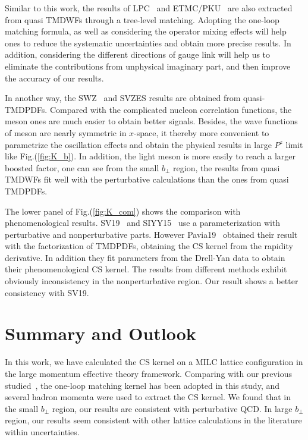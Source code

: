 \documentclass[prd,aps,twocolumn,preprintnumbers, showpacs, nofootinbib,superscriptaddress,notitlepage]{revtex4-1}
\begin{document}
Similar to this work, the results of LPC~\cite{LatticeParton:2020uhz} and ETMC/PKU~\cite{Li:2021wvl} are also extracted from quasi TMDWFs through a tree-level matching. Adopting the one-loop matching formula, as well as considering the operator mixing effects will help ones to reduce the systematic uncertainties and obtain more precise results. In addition, considering the different directions of gauge link will help us to eliminate the contributions from unphysical imaginary part, and then improve the accuracy of our results.

In another way, the SWZ~\cite{Shanahan:2021tst} and SVZES\cite{Schlemmer:2021aij} results are obtained from quasi-TMDPDFs. Compared with the complicated nucleon correlation functions, the meson ones are much easier to obtain better signals.  Besides, the wave functions of meson are nearly symmetric in $x$-space, it thereby more convenient to parametrize the oscillation effects and obtain the physical results in large $P^z$ limit like Fig.(\ref{fig:K_b}). In addition, the light meson is more easily to reach a larger boosted factor, one can see from the small $b_{\perp}$ region, the results from quasi TMDWFs fit well with the perturbative calculations than the ones from quasi TMDPDFs.

The lower panel of Fig.(\ref{fig:K_com}) shows the comparison with phenomenological results. SV19~\cite{Scimemi:2019cmh} and SIYY15~\cite{Sun:2014dqm} use a parameterization with perturbative and nonperturbative parts. However Pavia19~\cite{Bacchetta:2019sam} obtained their result with the factorization of TMDPDFs, obtaining the CS kernel from the rapidity derivative. In addition they fit parameters from the Drell-Yan data to obtain their phenomenological CS kernel. The results from different methods exhibit obviously inconsistency in the nonperturbative region. Our result shows a better consistency with SV19.

\section{Summary and Outlook}
\label{sec:summary}

In this work, we have calculated the CS kernel on a MILC lattice configuration in the large momentum effective theory framework. Comparing with our previous studied~\cite{LatticeParton:2020uhz}, the one-loop matching kernel has been adopted in this study, and several hadron momenta were used to extract the CS kernel. We found that in the small $b_{\perp}$ region, our results are consistent with perturbative QCD. 
In large $b_{\perp}$ region, our results seem consistent with other lattice calculations in the literature within uncertainties. 
\end{document}
